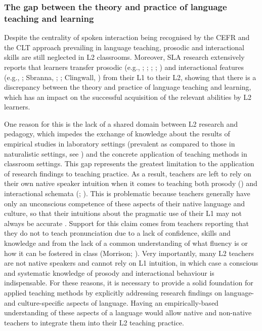 \subsubsection{The gap between the theory and practice of language teaching and learning}
\hypertarget{Toc191305876}{}
Despite the centrality of spoken interaction being recognised by the CEFR and the CLT approach prevailing in language teaching, prosodic and interactional skills are still neglected in L2 classrooms. Moreover, SLA research extensively reports that learners transfer prosodic (e.g., \citealt{RasierHiligsmann2007}; \citealt{GoadWhite2019}; \citealt{NavaZubizarreta2008}; \citealt{AustinEtAl2022}; \citealt{ZhangEtAl2023}) and interactional features (e.g., \citealt{Reinhardt2022}; Sbranna, \citealt{CangemiGrice2021}; \citealt{Handley2024}; Clingwall, \citealt{ClentonBrooks2024}) from their L1 to their L2, showing that there is a discrepancy between the theory and practice of language teaching and learning, which has an impact on the successful acquisition of the relevant abilities by L2 learners. 

One reason for this is the lack of a shared domain between L2 research and pedagogy, which impedes the exchange of knowledge about the results of empirical studies in laboratory settings (prevalent as compared to those in naturalistic settings, see \citealt{LoewenSato2018}) and the concrete application of teaching methods in classroom settings. This gap represents the greatest limitation to the application of research findings to teaching practice. As a result, teachers are left to rely on their own native speaker intuition when it comes to teaching both prosody (\citealt{DerwingMunro2015}) and interactional schemata (\citealt{Campbell-Larsen2022}; \citealt{TavakoliHunter2018}). This is problematic because teachers generally have only an unconscious competence of these aspects of their native language and culture, so that their intuitions about the pragmatic use of their L1 may not always be accurate \citep{Cohen2005}. Support for this claim comes from teachers reporting that they do not to teach pronunciation due to a lack of confidence, skills and knowledge \citep{Macdonald2002} and from the lack of a common understanding of what fluency is or how it can be fostered in class (Morrison; \citealt{Tavakoli2023}). Very importantly, many L2 teachers are not native speakers and cannot rely on L1 intuition, in which case a conscious and systematic knowledge of prosody and interactional behaviour is indispensable. For these reasons, it is necessary to provide a solid foundation for applied teaching methods by explicitly addressing research findings on language- and culture-specific aspects of language. Having an empirically-based understanding of these aspects of a language would allow native and non-native teachers to integrate them into their L2 teaching practice.

